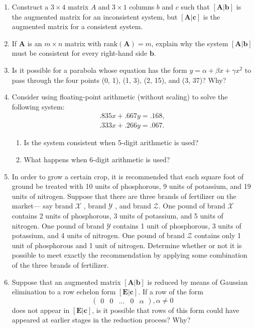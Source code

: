 \begin{enumerate}[leftmargin=*, label=\bfseries 2.3.\arabic*]
\item Construct a \(3 \times 4\) matrix \(A\) and \(3 \times 1\) columns \(b\) and \(c\) such that \([\mathbf{A}|\mathbf{b}]\) is the augmented matrix for an inconsistent system, but \([\mathbf{A}|\mathbf{c}]\) is the augmented matrix for a consistent system.

\item If \(\mathbf{A}\) is an \(m \times n\) matrix with rank\((\mathbf{A}) = m\), explain why the system \([\mathbf{A}|\mathbf{b}]\) must be consistent for every right-hand side \(\mathbf{b}\).

\item Is it possible for a parabola whose equation has the form \(y = \alpha+\beta x+\gamma x^2\) to pass through the four points (0, 1), (1, 3), (2, 15), and (3, 37)? Why?

\item Consider using floating-point arithmetic (without scaling) to solve the following system:
\[
\begin{array}{l}
.835x + .667y = .168, \\
.333x + .266y = .067.
\end{array}
\]
\begin{enumerate}[label=(\alph*)]
    \item Is the system consistent when 5-digit arithmetic is used?
    
    \item What happens when 6-digit arithmetic is used?
\end{enumerate}

\item In order to grow a certain crop, it is recommended that each square foot of ground be treated with 10 units of phosphorous, 9 units of potassium, and 19 units of nitrogen. 
Suppose that there are three brands of fertilizer on the market— say brand \(\mathcal{X}\) , brand \(\mathcal{Y}\) , and brand \(\mathcal{Z}\).
One pound of brand \(\mathcal{X}\) contains 2 units of phosphorous, 3 units of potassium, and 5 units of nitrogen. One pound of brand \(\mathcal{Y}\) contains 1 unit of phosphorous,
3 units of potassium, and 4 units of nitrogen. One pound of brand \(\mathcal{Z}\) contains only 1 unit of phosphorous and 1 unit of nitrogen.
Determine whether or not it is possible to meet exactly the recommendation by applying some combination of the three brands of fertilizer.

\item Suppose that an augmented matrix \([\mathbf{A}|\mathbf{b}]\) is reduced by means of Gaussian elimination to a row echelon form \([\mathbf{E}|\mathbf{c}]\). If a row of the form 
\[
\left(\begin{array}{cccc|c}
    0 & 0 & ... & 0 & \alpha
\end{array}\right), \alpha \neq 0
\]
does not appear in \([\mathbf{E}|\mathbf{c}]\), is it possible that rows of this form could have appeared at earlier stages in the reduction process? Why?

\end{enumerate}
